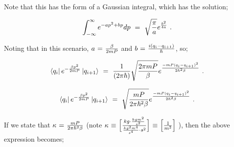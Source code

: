 \documentclass{ece}
\begin{document}
Note that this has the form of a Gaussian integral, which has the solution; 

\begin{equation} \label{eq:24}
\int_{- \infty}^{\infty} e^{{ -a p^2 + b p}} dp \hspace{0.125cm} = \hspace{0.125cm} \sqrt{\frac{\pi}{a}} e^{{\frac{b^2}{4 a}}} \hspace{0.125cm} .
\end{equation}

Noting that in this scenario, \begin{math} a \hspace{0.025cm} = \hspace{0.025cm} \frac{\beta}{2 m P} \end{math} and \begin{math} b \hspace{0.025cm} = \hspace{0.025cm} \frac{i (q_i - q_{i + 1})}{\hbar} \end{math}, so;

\begin{equation} \label{eq:25}
\bra{q_i} e^{ - \frac{ \beta p^2}{2 m P}} \ket{q_{i+1}} \hspace{0.125cm} = \hspace{0.125cm} \frac{1}{(2 \pi \hbar)} \sqrt{\frac{2 \pi m P}{\beta}}   e^{ \frac{ - m P (q_i - q_{i+1})^2}{2 \hbar^2 \beta}}  \hspace{0.125cm} .
\end{equation}

\begin{equation} \label{eq:26}
\bra{q_i} e^{ - \frac{ \beta p^2}{2 m P}} \ket{q_{i+1}} \hspace{0.125cm} = \hspace{0.125cm} \sqrt{\frac{m P}{2 \pi \hbar^2 \beta}} e^{ \frac{ - m P (q_i - q_{i+1})^2}{2 \hbar^2 \beta}} \hspace{0.125cm} .
\end{equation}

If we state that \begin{math} \kappa \hspace{0.025cm} = \hspace{0.025cm} \frac{m P}{2 \pi \hbar^2 \beta} \end{math} (note \begin{math} \kappa \hspace{0.025cm} \equiv \hspace{0.025cm} \Big[ \frac{kg \cdot \frac{kg m^2}{s^2}}{\frac{kg^2 m^4}{s^4} \cdot s^2}  \Big] \hspace{0.025cm} \equiv \hspace{0.025cm} \Big[ \frac{1}{m^2} \Big]  \end{math} ), then the above expression becomes;
\end{document}
